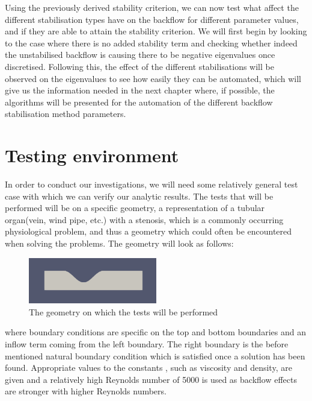 
Using the previously derived stability criterion, we can now test what affect the different stabilisation types have on the backflow for different parameter values, and if they are able to attain the stability criterion. We will first begin by looking to the case where there is no added stability term and checking whether indeed the unstabilised backflow is causing there to be negative eigenvalues once discretised. Following this, the effect of the different stabilisations will be observed on the eigenvalues to see how easily they can be automated, which will give us the information needed in the next chapter where, if possible, the algorithms will be presented for the automation of the different backflow stabilisation method parameters.

\section{Testing environment}

In order to conduct our investigations, we will need some relatively general test case with which we can verify our analytic results. The tests that will be performed will be on a specific geometry, a representation of a tubular organ(vein, wind pipe, etc.) with a stenosis, which is a commonly occurring physiological problem, and thus a geometry which could often be encountered when solving the problems. The geometry will look as follows:\\
\begin{figure}[h]
\centering
\includegraphics[width=0.5\textwidth]{latex/Thesis/media/stenosis.png}
\caption{The geometry on which the tests will be performed\label{fig:testgeo}}
\end{figure}

where boundary conditions are specific on the top and bottom boundaries and an inflow term coming from the left boundary. The right boundary is the before mentioned natural boundary condition which is satisfied once a solution has been found. Appropriate values to the constants , such as viscosity and density, are given and a relatively high Reynolds number of 5000 is used as backflow effects are stronger with higher Reynolds numbers.

